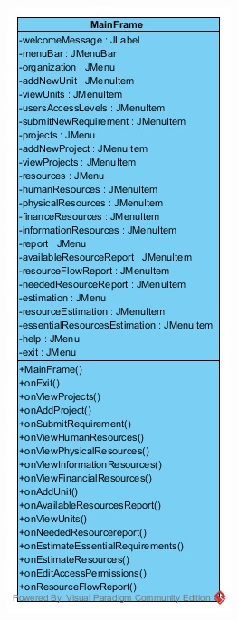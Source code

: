 \begin{figure}[H]
	\centering
	\begin{subfigure}[b]{0.3\textwidth}
		\includegraphics[width=\textwidth]{img/class-design/ui/MainFrame.jpg}

\end{subfigure}
\end{figure}

